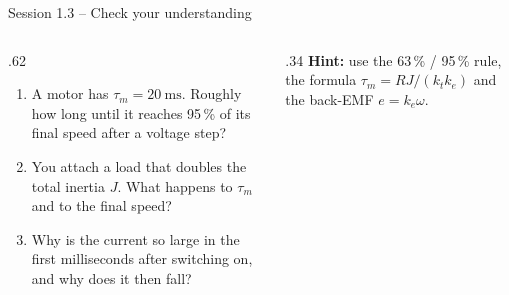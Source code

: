 \documentclass[aspectratio=169,10pt]{beamer}
\begin{document}
\begin{frame}{Session 1.3 -- Check your understanding}
\begin{columns}[T]
\begin{column}{.62\textwidth}
\begin{keybox}
\begin{enumerate}\setlength\itemsep{6pt}
\item A motor has $\tau_m=\SI{20}{\milli\second}$. Roughly how long until it reaches 95\,\% of its final speed after a voltage step?
\item You attach a load that doubles the total inertia $J$. What happens to $\tau_m$ and to the final speed?
\item Why is the current so large in the first milliseconds after switching on, and why does it then fall?
\end{enumerate}
\end{keybox}
\end{column}
\begin{column}{.34\textwidth}
\small
\textbf{Hint:} use the 63\,\% / 95\,\% rule, the formula $\tau_m=RJ/(k_tk_e)$ and the back-EMF $e=k_e\omega$.
\end{column}
\end{columns}
\end{frame}
\end{document}
